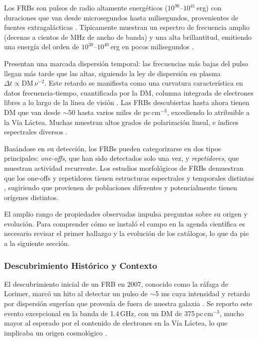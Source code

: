 Los FRBs son pulsos de radio altamente energéticos ($10^{36}$--$10^{41}$\,erg) con duraciones que van desde microsegundos hasta milisegundos, provenientes de fuentes extragalácticas \citep{Lorimer2007}. Típicamente muestran un espectro de frecuencia amplio (decenas a cientos de MHz de ancho de banda) y una alta brillantitud, emitiendo una energía del orden de $10^{38}$--$10^{40}$\,erg en pocos milisegundos \citep{Petroff_2022}.

Presentan una marcada dispersión temporal: las frecuencias más bajas del pulso llegan más tarde que las altas, siguiendo la ley de dispersión en plasma $\Delta t \propto \mathrm{DM}\,\nu^{-2}$. Este retardo se manifiesta como una curvatura característica en datos frecuencia-tiempo, cuantificada por la DM, columna integrada de electrones libres a lo largo de la línea de visión \citep{LorimerKramer2004}. Las FRBs descubiertas hasta ahora tienen DM que van desde $\sim$50 hasta varios miles de pc\,cm$^{-3}$, excediendo lo atribuible a la Vía Láctea. Muchas muestran altos grados de polarización lineal, e índices espectrales diversos \citep{CHIME2021}.

Basándose en su detección, los FRBs pueden categorizarse en dos tipos principales: \textit{one-offs}, que han sido detectados solo una vez, y \textit{repetidores}, que muestran actividad recurrente. Los estudios morfológicos de FRBs demuestran que los one-offs y repetidores tienen estructuras espectrales y temporales distintas \citep{Pleunis2021}, sugiriendo que provienen de poblaciones diferentes y potencialmente tienen orígenes distintos.

El amplio rango de propiedades observadas impulsa preguntas sobre su origen y evolución. Para comprender cómo se instaló el campo en la agenda científica es necesario revisar el primer hallazgo y la evolución de los catálogos, lo que da pie a la siguiente sección.

\subsubsection{Descubrimiento Histórico y Contexto}

El descubrimiento inicial de un FRB en 2007, conocido como la ráfaga de Lorimer, marcó un hito al detectar un pulso de $\sim$5 ms cuya intensidad y retardo por dispersión sugerían que provenía de fuera de nuestra galaxia \citep{Lorimer2007}. Se reporto este evento excepcional en la banda de 1.4\,GHz, con un DM de 375\,pc\,cm$^{-3}$, mucho mayor al esperado por el contenido de electrones en la Vía Láctea, lo que implicaba un origen cosmológico \citep{Lorimer2007,CordesMcLaughlin2003}.

